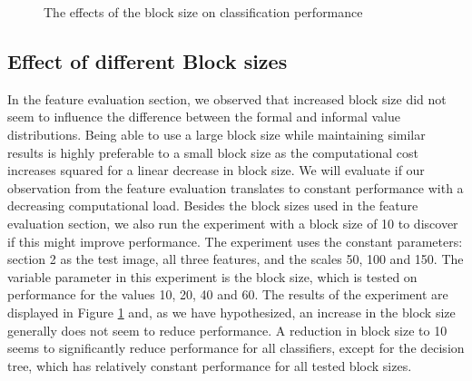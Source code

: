 \datatwo

\begin{figure}[]
	\caption{The effects of the block size on classification performance}
	\label{fig:res_bar_2}
\end{figure}

\subsection{Effect of different Block sizes}
In the feature evaluation section, we observed that increased block size did not seem to influence the difference between the formal and informal value distributions. Being able to use a large block size while maintaining similar results is highly preferable to a small block size as the computational cost increases squared for a linear decrease in block size. We will evaluate if our observation from the feature evaluation translates to constant performance with a decreasing computational load. Besides the block sizes used in the feature evaluation section, we also run the experiment with a block size of 10 to discover if this might improve performance. The experiment uses the constant parameters: section 2 as the test image, all three features, and the scales 50, 100 and 150. The variable parameter in this experiment is the block size, which is tested on performance for the values 10, 20, 40 and 60. The results of the experiment are displayed in Figure \ref{fig:res_bar_2} and, as we have hypothesized, an increase in the block size generally does not seem to reduce performance. A reduction in block size to 10 seems to significantly reduce performance for all classifiers, except for the decision tree, which has relatively constant performance for all tested block sizes.



